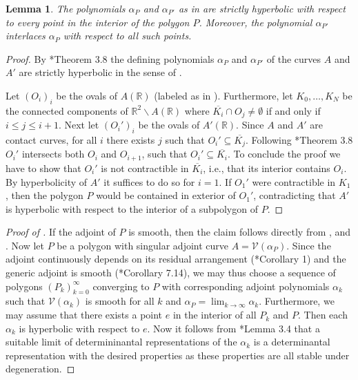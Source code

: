 \documentclass[a4paper,10pt]{amsart}
\theoremstyle{definition}
\theoremstyle{plain}
\newtheorem{lem}[Def]{Lemma}
\newcommand{\cV}{{\mathcal V}}
\newcommand{\R}{{\mathbb R}}
\begin{document}
\begin{lem}\label{cor:Interlacer}
    The polynomials $\alpha_P$ and $\alpha_{P'}$ as in  are strictly hyperbolic with respect to every point in the interior of the polygon $P$. Moreover, the polynomial $\alpha_{P'}$ interlaces $\alpha_P$ with respect to all such points.
\end{lem}

\begin{proof}   
    By \cite{KohnEtAl2024AdjCurves}*{Theorem 3.8} the defining polynomials $\alpha_P$ and $\alpha_{P'}$ of the curves $A$ and $A'$ are strictly hyperbolic in the sense of .

    Let $(O_i)_i$ be the ovals of $A(\R)$ (labeled as in ). Furthermore, let $K_0, \dots, K_N$ be the connected components of $\R^2\backslash A(\R)$ where $\overline{K_i} \cap O_j \neq \emptyset$ if and only if $i \leq j \leq i+1$. Next let $(O_i')_i$ be the ovals of $A'(\R)$. Since $A$ and $A'$ are contact curves, for all $i$ there exists $j$ such that $O_i' \subseteq \overline{K_j}$. Following \cite{KohnEtAl2024AdjCurves}*{Theorem 3.8} $O_i'$ intersects both $O_{i}$ and $O_{i+1}$, such that $O_i' \subseteq \overline{K_i}$. To conclude the proof we have to show that $O_i'$ is not contractible in $\overline{K_i}$, i.e., that its interior contains $O_i$. By hyperbolicity of $A'$ it suffices to do so for $i = 1$. If $O_1'$ were contractible in $K_1$, then the polygon $P$ would be contained in exterior of $O_1'$, contradicting that $A'$ is hyperbolic with respect to the interior of a subpolygon of $P$.    
\end{proof}

\begin{proof}[Proof of ]
    If the adjoint of $P$ is smooth, then the claim follows directly from ,  and . Now let $P$ be a polygon with singular adjoint curve $A = \cV(\alpha_P)$. Since the adjoint continuously depends on its residual arrangement (\cite{KohnRanestad2019AdjCurves}*{Corollary 1}) and the generic adjoint is smooth (\cite{telen2025toric}*{Corollary 7.14}), we may thus choose a sequence of polygons $(P_k)_{k=0}^\infty$ converging to $P$ with corresponding adjoint polynomials $\alpha_k$ such that $\cV(\alpha_k)$ is smooth for all $k$ and $\alpha_P = \lim_{k\to\infty} \alpha_k$. Furthermore, we may assume that there exists a point $e$ in the interior of all $P_k$ and $P$. Then each $\alpha_k$ is hyperbolic with respect to $e$. Now it follows from \cite{PlaumannVinzantHyp2013LDR}*{Lemma 3.4} that a suitable limit of determininantal representations of the $\alpha_k$ is a determinantal representation with the desired properties as these properties are all stable under degeneration.
\end{proof}
\end{document}
